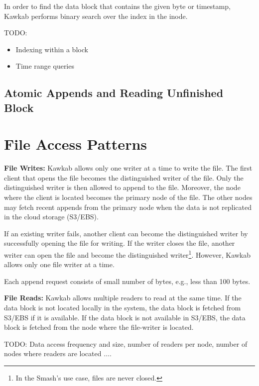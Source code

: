 \documentclass[]{article}
\newcommand{\subtopic}[1]{\vspace{1.5pt} \noindent \textbf{#1}}
\begin{document}
In order to find the data block that contains the given byte or timestamp, Kawkab
performs binary search over the index in the inode.

TODO:

\begin{itemize}
  \item Indexing within a block
  \item Time range queries
\end{itemize}


\subsection{Atomic Appends and Reading Unfinished Block}

\section{File Access Patterns}

\subtopic{File Writes:} Kawkab allows only one writer at a time to
write the file. The first client that opens the file becomes the distinguished
writer of the file. Only the distinguished writer is then allowed to append to
the file. Moreover, the node where the client is located becomes the primary
node of the file.  The other nodes may fetch recent appends from the primary
node when the data is not replicated in the cloud storage (S3/EBS).

If an existing writer fails, another client can become the distinguished writer
by successfully opening the file for writing. If the writer closes the file,
another writer can open the file and become the distinguished
writer\footnote{In the Smash's use case, files are never closed.}. However,
Kawkab allows only one file writer at a time.

Each append request consists of small number of bytes, e.g., less than 100 bytes.

\subtopic{File Reads:}
Kawkab allows multiple readers to read at the same time. If the data block
is not located locally in the system, the data block is fetched from S3/EBS if
it is available. If the data block is not available in S3/EBS, the data block
is fetched from the node where the file-writer is located.

TODO: Data access frequency and size, number of readers per node, number of
nodes where readers are located $\ldots$.
\end{document}
